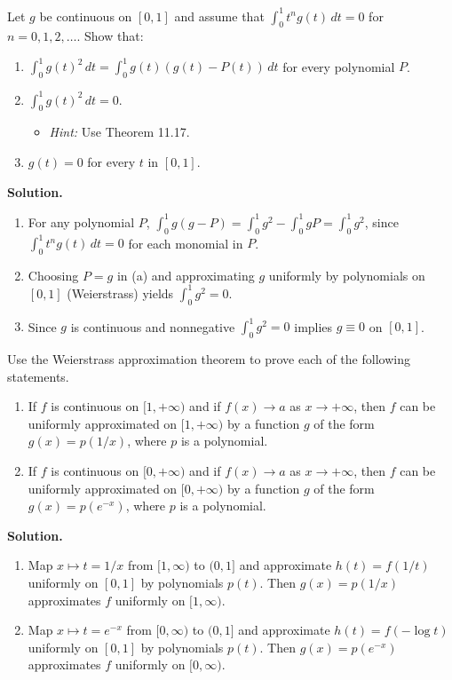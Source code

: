 \begin{problembox}
Let $g$ be continuous on $[0, 1]$ and assume that $\int_0^1 t^n g(t) \, dt = 0$ for $n = 0, 1, 2, \dots$. Show that:
\begin{enumerate}[label=(\alph*)]
\item $\int_0^1 g(t)^2 \, dt = \int_0^1 g(t)(g(t) - P(t)) \, dt$ for every polynomial $P$.
\item $\int_0^1 g(t)^2 \, dt = 0$.
\begin{itemize}
\item \textit{Hint:} Use Theorem 11.17.
\end{itemize}
\item $g(t) = 0$ for every $t$ in $[0, 1]$.
\end{enumerate}
\end{problembox}

\noindent\textbf{Solution.}
\begin{enumerate}[label=(\alph*)]
\item For any polynomial $P$, $\int_0^1 g(g-P)=\int_0^1 g^2-\int_0^1 gP=\int_0^1 g^2$, since $\int_0^1 t^n g(t)\,dt=0$ for each monomial in $P$.
\item Choosing $P=g$ in (a) and approximating $g$ uniformly by polynomials on $[0,1]$ (Weierstrass) yields $\int_0^1 g^2=0$.
\item Since $g$ is continuous and nonnegative $\int_0^1 g^2=0$ implies $g\equiv0$ on $[0,1]$.
\end{enumerate}

\begin{problembox}
Use the Weierstrass approximation theorem to prove each of the following statements.
\begin{enumerate}[label=(\alph*)]
\item If $f$ is continuous on $[1, +\infty)$ and if $f(x) \to a$ as $x \to +\infty$, then $f$ can be uniformly approximated on $[1, +\infty)$ by a function $g$ of the form $g(x) = p(1/x)$, where $p$ is a polynomial.
\item If $f$ is continuous on $[0, +\infty)$ and if $f(x) \to a$ as $x \to +\infty$, then $f$ can be uniformly approximated on $[0, +\infty)$ by a function $g$ of the form $g(x) = p(e^{-x})$, where $p$ is a polynomial.
\end{enumerate}
\end{problembox}

\noindent\textbf{Solution.}
\begin{enumerate}[label=(\alph*)]
\item Map $x\mapsto t=1/x$ from $[1,\infty)$ to $(0,1]$ and approximate $h(t)=f(1/t)$ uniformly on $[0,1]$ by polynomials $p(t)$. Then $g(x)=p(1/x)$ approximates $f$ uniformly on $[1,\infty)$.
\item Map $x\mapsto t=e^{-x}$ from $[0,\infty)$ to $(0,1]$ and approximate $h(t)=f(-\log t)$ uniformly on $[0,1]$ by polynomials $p(t)$. Then $g(x)=p(e^{-x})$ approximates $f$ uniformly on $[0,\infty)$.
\end{enumerate}

